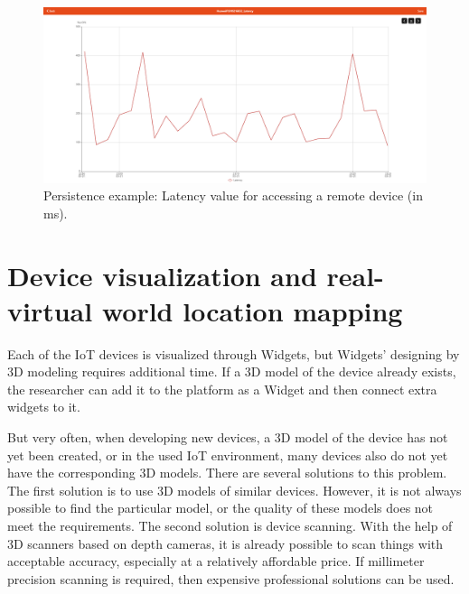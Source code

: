\begin{figure}
  \centering
  \includegraphics[width=0.9\linewidth]{figures/PersistenceExample.png}
  \caption{Persistence example: Latency value for accessing a remote device (in ms). }
  \label{fig:PersistenceExample-figure}
\end{figure}

\section{Device visualization and real-virtual world location mapping}

Each of the IoT devices is visualized through Widgets, but Widgets' designing by 3D modeling requires additional time. If a 3D model of the device already exists, the researcher can add it to the platform as a Widget and then connect extra widgets to it.

But very often, when developing new devices, a 3D model of the device has not yet been created, or in the used IoT environment, many devices also do not yet have the corresponding 3D models. There are several solutions to this problem. The first solution is to use 3D models of similar devices. However, it is not always possible to find the particular model, or the quality of these models does not meet the requirements. The second solution is device scanning. With the help of 3D scanners based on depth cameras, it is already possible to scan things with acceptable accuracy, especially at a relatively affordable price. If millimeter precision scanning is required, then expensive professional solutions can be used.

